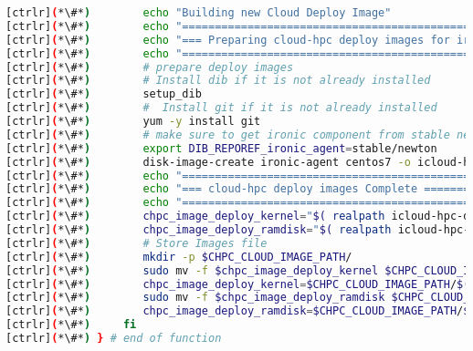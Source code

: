 \begin{lstlisting}[language=bash,keywords={}]
[ctrlr](*\#*)        echo "Building new Cloud Deploy Image"
[ctrlr](*\#*)        echo "====================================================================="
[ctrlr](*\#*)        echo "=== Preparing cloud-hpc deploy images for ironic====================="
[ctrlr](*\#*)        echo "====================================================================="
[ctrlr](*\#*)        # prepare deploy images
[ctrlr](*\#*)        # Install dib if it is not already installed
[ctrlr](*\#*)        setup_dib
[ctrlr](*\#*)        #  Install git if it is not already installed
[ctrlr](*\#*)        yum -y install git
[ctrlr](*\#*)        # make sure to get ironic component from stable newton release
[ctrlr](*\#*)        export DIB_REPOREF_ironic_agent=stable/newton
[ctrlr](*\#*)        disk-image-create ironic-agent centos7 -o icloud-hpc-deploy-c7
[ctrlr](*\#*)        echo "====================================================================="
[ctrlr](*\#*)        echo "=== cloud-hpc deploy images Complete ================================"
[ctrlr](*\#*)        echo "====================================================================="
[ctrlr](*\#*)        chpc_image_deploy_kernel="$( realpath icloud-hpc-deploy-c7.kernel)"
[ctrlr](*\#*)        chpc_image_deploy_ramdisk="$( realpath icloud-hpc-deploy-c7.initramfs)"
[ctrlr](*\#*)        # Store Images file
[ctrlr](*\#*)        mkdir -p $CHPC_CLOUD_IMAGE_PATH/
[ctrlr](*\#*)        sudo mv -f $chpc_image_deploy_kernel $CHPC_CLOUD_IMAGE_PATH/
[ctrlr](*\#*)        chpc_image_deploy_kernel=$CHPC_CLOUD_IMAGE_PATH/$(basename $chpc_image_deploy_kernel)
[ctrlr](*\#*)        sudo mv -f $chpc_image_deploy_ramdisk $CHPC_CLOUD_IMAGE_PATH/
[ctrlr](*\#*)        chpc_image_deploy_ramdisk=$CHPC_CLOUD_IMAGE_PATH/$(basename $chpc_image_deploy_ramdisk)
[ctrlr](*\#*)     fi
[ctrlr](*\#*) } # end of function
\end{lstlisting}





